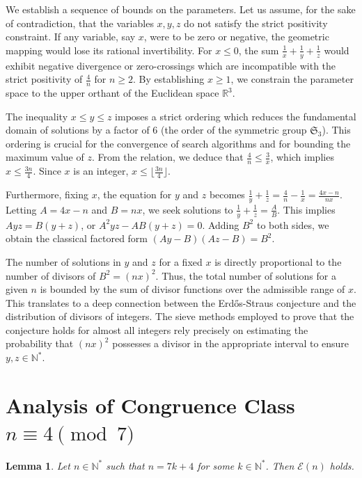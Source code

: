 \documentclass[12pt, a4paper]{article}
\newtheorem{lemma}[theorem]{Lemma}
\theoremstyle{definition}
\theoremstyle{remark}
\begin{document}
We establish a sequence of bounds on the parameters. Let us assume, for the sake of contradiction, that the variables $x, y, z$ do not satisfy the strict positivity constraint. If any variable, say $x$, were to be zero or negative, the geometric mapping would lose its rational invertibility. For $x \le 0$, the sum $\frac{1}{x} + \frac{1}{y} + \frac{1}{z}$ would exhibit negative divergence or zero-crossings which are incompatible with the strict positivity of $\frac{4}{n}$ for $n \ge 2$. By establishing $x \ge 1$, we constrain the parameter space to the upper orthant of the Euclidean space $\mathbb{R}^3$.

The inequality $x \le y \le z$ imposes a strict ordering which reduces the fundamental domain of solutions by a factor of 6 (the order of the symmetric group $\mathfrak{S}_3$). This ordering is crucial for the convergence of search algorithms and for bounding the maximum value of $z$. From the relation, we deduce that $\frac{4}{n} \le \frac{3}{x}$, which implies $x \le \frac{3n}{4}$. Since $x$ is an integer, $x \le \lfloor \frac{3n}{4} \rfloor$.

Furthermore, fixing $x$, the equation for $y$ and $z$ becomes $\frac{1}{y} + \frac{1}{z} = \frac{4}{n} - \frac{1}{x} = \frac{4x - n}{nx}$. Letting $A = 4x - n$ and $B = nx$, we seek solutions to $\frac{1}{y} + \frac{1}{z} = \frac{A}{B}$. This implies $Ayz = B(y+z)$, or $A^2 y z - AB(y+z) = 0$. Adding $B^2$ to both sides, we obtain the classical factored form $(Ay - B)(Az - B) = B^2$.

The number of solutions in $y$ and $z$ for a fixed $x$ is directly proportional to the number of divisors of $B^2 = (nx)^2$. Thus, the total number of solutions for a given $n$ is bounded by the sum of divisor functions over the admissible range of $x$. This translates to a deep connection between the Erd\H{o}s-Straus conjecture and the distribution of divisors of integers. The sieve methods employed to prove that the conjecture holds for almost all integers rely precisely on estimating the probability that $(nx)^2$ possesses a divisor in the appropriate interval to ensure $y, z \in \mathbb{N}^*$.

\section{Analysis of Congruence Class $n \equiv 4 \pmod 7$}

\begin{lemma}
Let $n \in \mathbb{N}^*$ such that $n = 7k + 4$ for some $k \in \mathbb{N}^*$. Then $\mathcal{E}(n)$ holds.
\end{lemma}
\end{document}
